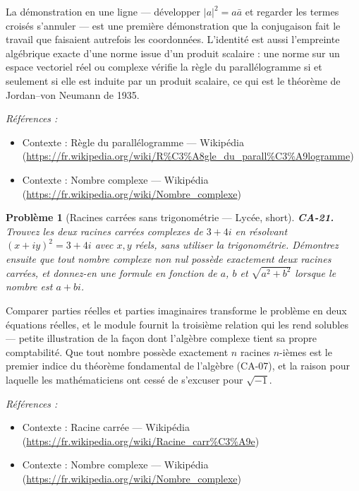 \documentclass[11pt]{article}
\newtheorem{problem}{Problème}
\newenvironment{refs}{\par\small\noindent\emph{Références :}\begin{itemize}\setlength\itemsep{0pt}}{\end{itemize}\normalsize}
\begin{document}
\noindent La démonstration en une ligne --- développer $ |a|^2 = a\bar{a} $ et regarder les
termes croisés s'annuler --- est une première démonstration que la conjugaison fait le travail que
faisaient autrefois les coordonnées. L'identité est aussi l'empreinte algébrique exacte d'une norme
issue d'un produit scalaire : une norme sur un espace vectoriel réel ou complexe vérifie la règle du
parallélogramme si et seulement si elle est induite par un produit scalaire, ce qui est le théorème
de Jordan--von Neumann de 1935.

\begin{refs}
\item Contexte : Règle du parallélogramme --- Wikipédia (\url{https://fr.wikipedia.org/wiki/R%C3%A8gle_du_parall%C3%A9logramme})
\item Contexte : Nombre complexe --- Wikipédia (\url{https://fr.wikipedia.org/wiki/Nombre_complexe})
\end{refs}

\bigskip

\begin{problem}[{Racines carrées sans trigonométrie --- Lycée, short}]
\textbf{CA-21.} Trouvez les deux racines carrées complexes de $ 3 + 4i $ en
résolvant $ (x + iy)^2 = 3 + 4i $ avec $ x, y $ réels, sans utiliser la trigonométrie. Démontrez
ensuite que tout nombre complexe non nul possède exactement deux racines carrées, et donnez-en une
formule en fonction de $ a $, $ b $ et $ \sqrt{a^2 + b^2} $ lorsque le nombre est
$ a + bi $.
\end{problem}

\noindent Comparer parties réelles et parties imaginaires transforme le problème en deux
équations réelles, et le module fournit la troisième relation qui les rend solubles --- petite
illustration de la façon dont l'algèbre complexe tient sa propre comptabilité. Que tout nombre
possède exactement $ n $ racines $ n $-ièmes est le premier indice du théorème fondamental de
l'algèbre (CA-07), et la raison pour laquelle les mathématiciens ont cessé de s'excuser pour
$ \sqrt{-1} $.

\begin{refs}
\item Contexte : Racine carrée --- Wikipédia (\url{https://fr.wikipedia.org/wiki/Racine_carr%C3%A9e})
\item Contexte : Nombre complexe --- Wikipédia (\url{https://fr.wikipedia.org/wiki/Nombre_complexe})
\end{refs}

\bigskip
\end{document}
